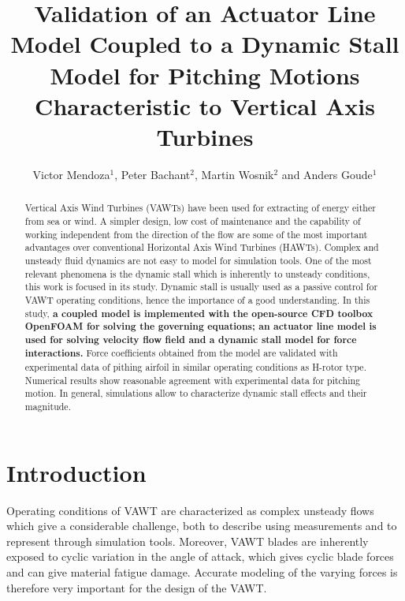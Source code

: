 \documentclass[a4paper]{jpconf}
\begin{document}
\title{Validation of an Actuator Line Model Coupled to a Dynamic Stall Model for
Pitching Motions Characteristic to Vertical Axis Turbines}


\author{Victor Mendoza$^{1}$, Peter Bachant$^{2}$, Martin Wosnik$^{2}$ and Anders Goude$^{1}$ }
\address{$^{1}$ Department of Engineering Sciences, Division of Electricity, Uppsala University, \\Uppsala 751 21, Sweden}
\address{$^{2}$ Center for Ocean Renewable Energy, University of New Hampshire, 24 Colovos Rd.,\\ Durham, NH 03824, USA}


\begin{abstract}

    Vertical Axis Wind Turbines (VAWTs) have been used for extracting of energy
    either from sea or wind. A simpler design, low cost of maintenance and the
    capability of working independent from the direction of the flow are some of
    the most important advantages over conventional Horizontal Axis Wind
    Turbines (HAWTs). Complex and unsteady fluid dynamics are not easy to model
    for simulation tools. One of the most relevant phenomena is the dynamic
    stall which is inherently to unsteady conditions, this work is focused in
    its study. Dynamic stall is usually used as a passive control for VAWT
    operating conditions, hence the importance of a good understanding. In this
    study, \textbf{a coupled model is implemented with the open-source CFD
    toolbox OpenFOAM for solving the governing equations; an actuator line model
    is used for solving velocity flow field and a dynamic stall model for force
    interactions.} Force coefficients obtained from the model are validated with
    experimental data of pithing airfoil in similar operating conditions as
    H-rotor type. Numerical results show reasonable agreement with experimental
    data for pitching motion. In general, simulations allow to characterize
    dynamic stall effects  and their magnitude.

\end{abstract}


\section{Introduction}

Operating conditions of VAWT are characterized as complex unsteady flows which
give a considerable challenge, both to describe using measurements and to
represent through simulation tools\cite{huyer1996unsteady}. Moreover, VAWT
blades are inherently exposed to cyclic variation in the angle of attack, which
gives cyclic blade forces and can give material fatigue damage. Accurate
modeling of the varying forces is therefore very important for the design of the
VAWT.
\end{document}
